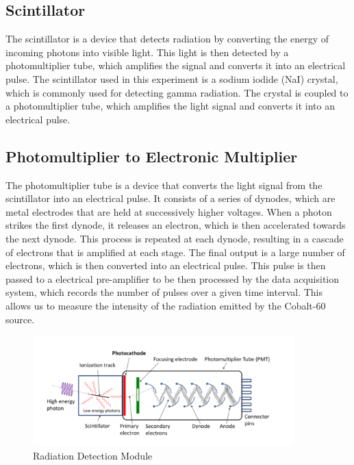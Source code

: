 \documentclass[12pt]{article}
\begin{document}
        \subsection{Scintillator}
            The scintillator is a device that detects radiation by converting the energy of incoming photons into visible light. 
            This light is then detected by a photomultiplier tube, which amplifies the signal and converts it into an electrical pulse. 
            The scintillator used in this experiment is a sodium iodide (NaI) crystal, which is commonly used for detecting gamma radiation. 
            The crystal is coupled to a photomultiplier tube, which amplifies the light signal and converts it into an electrical pulse. 

        \subsection{Photomultiplier to Electronic Multiplier}
            The photomultiplier tube is a device that converts the light signal from the scintillator into an electrical pulse. 
            It consists of a series of dynodes, which are metal electrodes that are held at successively higher voltages. 
            When a photon strikes the first dynode, it releases an electron, which is then accelerated towards the next dynode. 
            This process is repeated at each dynode, resulting in a cascade of electrons that is amplified at each stage. 
            The final output is a large number of electrons, which is then converted into an electrical pulse. 
            This pulse is then passed to a electrical pre-amplifier to be then processed by the data acquisition system, 
            which records the number of pulses over a given time interval. 
            This allows us to measure the intensity of the radiation emitted by the Cobalt-60 source.

            \begin{figure}[!htb]
                \centering
                \includegraphics[width=0.9\textwidth]{./img/other/module.png}
                \caption{Radiation Detection Module}
                \label{fig:Radiation Detection Module}
            \end{figure}
            
\end{document}
